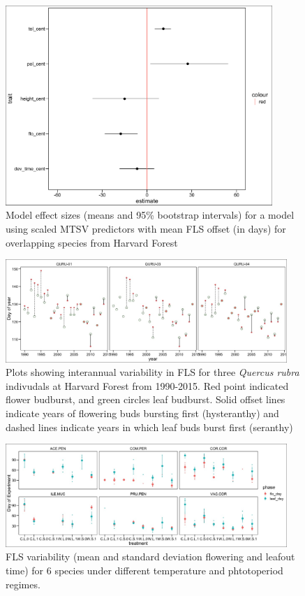 \documentclass{article}\usepackage[]{graphicx}\usepackage[]{color}
\begin{document}
\begin{figure}[here]
\includegraphics[width=0.9\textwidth]{..//figures/HF_continuous_scaled_model.pdf} %
\caption{Model effect sizes (means and 95\% bootstrap intervals) for a model using scaled MTSV predictors with mean FLS offset (in days) for overlapping species from Harvard Forest}
\label{fig:Figure 2}
\end{figure}

\begin{figure}[here]
\includegraphics[width=0.95\textwidth]{..//figures/QURU_HF_intervar.jpeg} %
\caption{Plots showing interannual variability in FLS for three \textit{Quercus rubra} indivudals at Harvard Forest from 1990-2015. Red point indicated flower budburst, and green circles leaf budburst. Solid offset lines indicate years of flowering buds bursting first (hysteranthy) and dashed lines indicate years in which leaf buds burst first (seranthy)}
\label{fig:Figure 3}
\end{figure}

\begin{figure}[here]
\includegraphics[width=0.95\textwidth]{..//figures/raw_flobuds.jpeg}
\caption{FLS variability (mean and standard deviation flowering and leafout time) for 6 species under different temperature and phtotoperiod regimes.}
\label{fig:Figure 4}
\end{figure}
\end{document}
